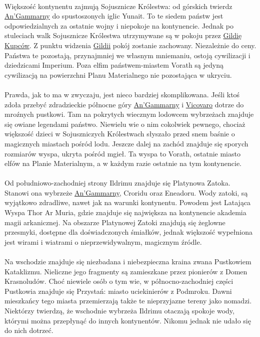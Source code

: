 \documentclass[10pt,twoside,twocolumn]{book}
\begin{document}
\paragraph{}
Większość kontynentu zajmują Sojusznicze Królestwa: od górskich twierdz \hyperref[AnGammarna]{An’Gammarny} do spustoszonych iglic Yunait.
To te siedem państw jest odpowiedzialnych za ostatnie wojny i niepokoje na kontynencie.
Jednak po stuleciach walk Sojusznicze Królestwa utrzymywane są w pokoju przez \hyperref[GildiaKupcow]{Gildię Kupców}.
Z punktu widzenia \hyperref[GildiaKupcow]{Gildii} pokój zostanie zachowany.
Niezależnie do ceny.
Państwa te pozostają, przynajmniej we własnym mniemaniu, ostoją cywilizacji i dziedzicami Imperium.
Poza elfim państwem-miastem Vorath są jedyną cywilizacją na powierzchni Planu Materialnego nie pozostająca w ukryciu.

\paragraph{}
Prawda, jak to ma w zwyczaju, jest nieco bardziej skomplikowana.
Jeśli ktoś zdoła przebyć zdradzieckie północne góry \hyperref[AnGammarna]{An’Gammarny} i \hyperref[Vicovaro]{Vicovaro} dotrze do mroźnych pustkowi.
Tam na pokrytych wiecznym lodowcem wybrzeżach znajduje się owiane legendami państwo.
Niewielu wie o nim cokolwiek pewnego, chociaż większość dzieci w Sojuszniczych Królestwach słyszało przed snem baśnie o magicznych miastach pośród lodu.
Jeszcze dalej na zachód znajduje się sporych rozmiarów wyspa, ukryta pośród mgieł.
Ta wyspa to Vorath, ostatnie miasto elfów na Planie Materialnym, a w każdym razie ostatnie na tym kontynencie.

\paragraph{}
Od południowo-zachodniej strony Ildrimu znajduje się Platynowa Zatoka.
Stanowi ona wybrzeże \hyperref[AnGammarna]{An’Gammarny}, Croridu oraz Eneadoru.
Wody zatoki, są wyjątkowo zdradliwe, nawet jak na warunki kontynentu.
Powodem jest Latająca Wyspa Thor Ar Muria, gdzie znajduje się największa na kontynencie akademia magii arkanicznej.
Na obszarze Platynowej Zatoki znajdują się żeglowne przesmyki, dostępne dla doświadczonych śmiałków, jednak większość wypełniona jest wirami i wiatrami o nieprzewidywalnym, magicznym źródle.

\paragraph{}
Na wschodzie znajduje się niezbadana i niebezpieczna kraina zwana Pustkowiem Kataklizmu.
Nieliczne jego fragmenty są zamieszkane przez pionierów z Domen Krasnoludów.
Choć niewiele osób o tym wie, w północno-zachodniej części Pustkowia znajduje się Przystań: miasto uciekinierów z Podmroku.
Dawni mieszkańcy tego miasta przemierzają także te nieprzyjazne tereny jako nomadzi.
Niektórzy twierdzą, że wschodnie wybrzeża Ildrimu otaczają spokoje wody, którymi można przepłynąć do innych kontynentów. Nikomu jednak nie udało się do nich dotrzeć.
\end{document}
